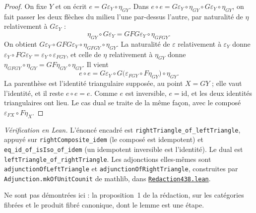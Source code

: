 \begin{proof}
On fixe $Y$ et on écrit $e = G\varepsilon_Y \circ \eta_{GY}$. Dans $e \circ e = G\varepsilon_Y \circ \eta_{GY} \circ G\varepsilon_Y \circ \eta_{GY}$, on fait passer les deux flèches du milieu l'une par-dessus l'autre, par naturalité de $\eta$ relativement à $G\varepsilon_Y$ :
\[
\eta_{GY} \circ G\varepsilon_Y = GFG\varepsilon_Y \circ \eta_{GFGY}.
\]
On obtient $G\varepsilon_Y \circ GFG\varepsilon_Y \circ \eta_{GFGY} \circ \eta_{GY}$. La naturalité de $\varepsilon$ relativement à $\varepsilon_Y$ donne $\varepsilon_Y \circ FG\varepsilon_Y = \varepsilon_Y \circ \varepsilon_{FGY}$, et celle de $\eta$ relativement à $\eta_{GY}$ donne $\eta_{GFGY} \circ \eta_{GY} = GF\eta_{GY} \circ \eta_{GY}$. Il vient
\[
e \circ e = G\varepsilon_Y \circ G\bigl(\varepsilon_{FGY} \circ F\eta_{GY}\bigr) \circ \eta_{GY}.
\]
La parenthèse est l'identité triangulaire supposée, au point $X = GY$ ; elle vaut l'identité, et il reste $e \circ e = e$. Comme $e$ est inversible, $e = \mathrm{id}$, et les deux identités triangulaires ont lieu. Le cas dual se traite de la même façon, avec le composé $\varepsilon_{FX} \circ F\eta_X$.
\end{proof}

\noindent\emph{Vérification en Lean.} L'énoncé encadré est \texttt{rightTriangle\_of\_leftTriangle}, appuyé sur \texttt{rightComposite\_idem} (le composé est idempotent) et \texttt{eq\_id\_of\_isIso\_of\_idem} (un idempotent inversible est l'identité). Le dual est \texttt{leftTriangle\_of\_rightTriangle}. Les adjonctions elles-mêmes sont \texttt{adjunctionOfLeftTriangle} et \texttt{adjunctionOfRightTriangle}, construites par \texttt{Adjunction.\allowbreak{}mkOfUnitCounit} de mathlib, dans \href{\leanblobmain/Redaction438.lean}{\texttt{Redaction438.\allowbreak{}lean}}.

Ne sont pas démontrées ici : la proposition~1 de la rédaction, sur les catégories fibrées et le produit fibré canonique, dont le lemme est une étape.

